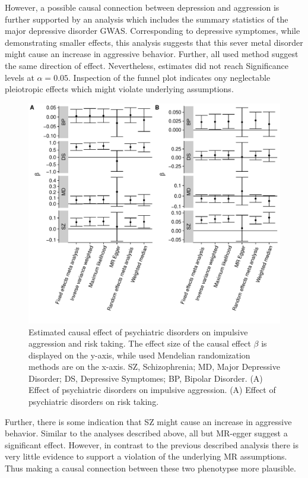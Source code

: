 However, a possible causal connection between depression and aggression is further supported by an analysis which includes the summary statistics of the major depressive disorder GWAS\@.
Corresponding to depressive symptomes, while demonstrating smaller effects, this analysis suggests that this sever metal disorder might cause an increase in aggressive behavior. 
Further, all used method suggest the same direction of effect.
Nevertheless, estimates did not reach Significance levels at $\alpha=0.05$.
Inspection of the funnel plot indicates ony neglectable pleiotropic effects which might violate underlying assumptions.

\begin{figure}[htpb]
  \centering
  \includegraphics[width=0.9\linewidth]{figures/overall_mr_effect.pdf}
  \caption{Estimated causal effect of psychiatric disorders on impulsive aggression and risk taking.
    The effect size of the causal effect $\beta$ is displayed on the y-axis, while used Mendelian randomization methods are on the x-axis.
    SZ, Schizophrenia; MD, Major Depressive Disorder; DS, Depressive Symptomes; BP, Bipolar Disorder.
    (A) Effect of psychiatric disorders on impulsive aggression.
    (A) Effect of psychiatric disorders on risk taking.
  }\label{fig:overall_mr_effect}
\end{figure}

Further, there is some indication that SZ might cause an increase in aggressive behavior.
Similar to the analyses described above, all but MR-egger suggest a significant effect. 
However, in contrast to the previous described analysis there is very little evidence to support a violation of the underlying MR assumptions.
Thus making a causal connection between these two phenotypse more plausible.

